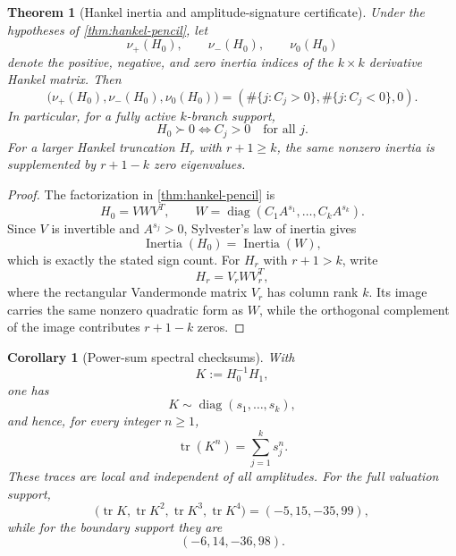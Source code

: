 \documentclass[aps,prd,preprint,onecolumn,nofootinbib,superscriptaddress,showkeys]{revtex4-2}
\numberwithin{equation}{section}
\theoremstyle{definition}
\theoremstyle{plain}
\newtheorem{theorem}{Theorem}[section]
\newtheorem{corollary}{Corollary}[section]
\newcommand{\diag}{\operatorname{diag}}
\begin{document}
\begin{theorem}[Hankel inertia and amplitude-signature certificate]\label{thm:hankel-inertia}
Under the hypotheses of \cref{thm:hankel-pencil}, let
\[
\nu_+(H_0),\qquad \nu_-(H_0),\qquad \nu_0(H_0)
\]
denote the positive, negative, and zero inertia indices of the $k\times k$ derivative Hankel matrix.  Then
\begin{equation}
\boxed{
\bigl(\nu_+(H_0),\nu_-(H_0),\nu_0(H_0)\bigr)
=
\left(
\#\{j:C_j>0\},
\#\{j:C_j<0\},
0
\right).
}
\end{equation}
In particular, for a fully active $k$-branch support,
\begin{equation}
\boxed{
H_0\succ0
\iff
C_j>0\quad\text{for all }j.
}
\end{equation}
For a larger Hankel truncation $H_r$ with $r+1\ge k$, the same nonzero inertia is supplemented by $r+1-k$ zero eigenvalues.
\end{theorem}

\begin{proof}
The factorization in \cref{thm:hankel-pencil} is
\[
H_0=VWV^T,
\qquad
W=\diag(C_1A^{s_1},\ldots,C_kA^{s_k}).
\]
Since $V$ is invertible and $A^{s_j}>0$, Sylvester's law of inertia gives
\[
\operatorname{Inertia}(H_0)=\operatorname{Inertia}(W),
\]
which is exactly the stated sign count.  For $H_r$ with $r+1>k$, write
\[
H_r=V_rWV_r^T,
\]
where the rectangular Vandermonde matrix $V_r$ has column rank $k$.  Its image carries the same nonzero quadratic form as $W$, while the orthogonal complement of the image contributes $r+1-k$ zeros.
\end{proof}

\begin{corollary}[Power-sum spectral checksums]\label{cor:spectral-traces}
With
\[
K:=H_0^{-1}H_1,
\]
one has
\begin{equation}
K\sim\diag(s_1,\ldots,s_k),
\end{equation}
and hence, for every integer $n\ge1$,
\begin{equation}
\boxed{
\operatorname{tr}(K^n)=\sum_{j=1}^k s_j^n.
}
\end{equation}
These traces are local and independent of all amplitudes.  For the full valuation support,
\begin{equation}
\bigl(\operatorname{tr}K,\operatorname{tr}K^2,
\operatorname{tr}K^3,\operatorname{tr}K^4\bigr)
=(-5,15,-35,99),
\end{equation}
while for the boundary support they are
\begin{equation}
(-6,14,-36,98).
\end{equation}
\end{corollary}
\end{document}
